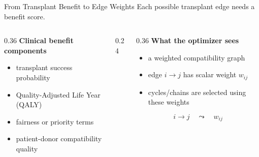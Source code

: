 \documentclass[aspectratio=169]{beamer}
\begin{document}
\begin{frame}{From Transplant Benefit to Edge Weights}
  \small
  Each possible transplant edge needs a benefit score.

  \vspace{0.8em}
  \begin{columns}[T,onlytextwidth]
    \begin{column}{0.36\textwidth}
      \textbf{Clinical benefit components}
      \begin{itemize}\setlength{\itemsep}{0.35em}
        \item transplant success probability
        \item Quality-Adjusted Life Year (QALY)
        \item fairness or priority terms
        \item patient-donor compatibility quality
      \end{itemize}
    \end{column}

    \begin{column}{0.24\textwidth}
      \centering
      \vspace{0.2em}
    \end{column}

    \begin{column}{0.36\textwidth}
      \textbf{What the optimizer sees}
      \begin{itemize}\setlength{\itemsep}{0.45em}
        \item a weighted compatibility graph
        \item edge \(i\to j\) has scalar weight \(w_{ij}\)
        \item cycles/chains are selected using these weights
      \end{itemize}

      \vspace{0.4em}
      \[
        i\to j \quad \leadsto \quad w_{ij}
      \]
    \end{column}
  \end{columns}
\end{frame}
\end{document}
